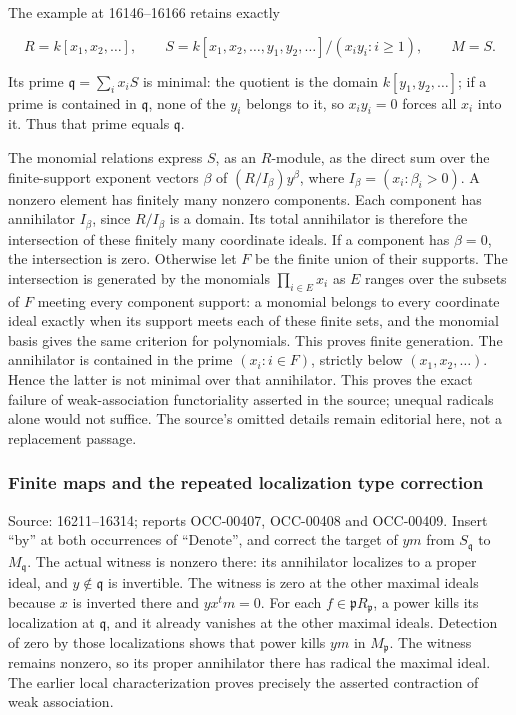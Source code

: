 The example at 16146--16166 retains exactly

\[
R=k[x_1,x_2,\ldots],\qquad
S=k[x_1,x_2,\ldots,y_1,y_2,\ldots]/(x_iy_i:i\geq1),\qquad M=S.
\]

Its prime \(\mathfrak q=\sum_i x_iS\) is minimal: the quotient is the domain \(k[y_1,y_2,\ldots]\); if a prime is contained in \(\mathfrak q\), none of the \(y_i\) belongs to it, so \(x_iy_i=0\) forces all \(x_i\) into it. Thus that prime equals \(\mathfrak q\).

The monomial relations express \(S\), as an \(R\)-module, as the direct sum over the finite-support exponent vectors \(\beta\) of \((R/I_\beta)y^\beta\), where \(I_\beta=(x_i:\beta_i>0)\). A nonzero element has finitely many nonzero components. Each component has annihilator \(I_\beta\), since \(R/I_\beta\) is a domain. Its total annihilator is therefore the intersection of these finitely many coordinate ideals. If a component has \(\beta=0\), the intersection is zero. Otherwise let \(F\) be the finite union of their supports. The intersection is generated by the monomials \(\prod_{i\in E}x_i\) as \(E\) ranges over the subsets of \(F\) meeting every component support: a monomial belongs to every coordinate ideal exactly when its support meets each of these finite sets, and the monomial basis gives the same criterion for polynomials. This proves finite generation. The annihilator is contained in the prime \((x_i:i\in F)\), strictly below \((x_1,x_2,\ldots)\). Hence the latter is not minimal over that annihilator. This proves the exact failure of weak-association functoriality asserted in the source; unequal radicals alone would not suffice. The source's omitted details remain editorial here, not a replacement passage.

\subsubsection{Finite maps and the repeated localization type correction}\label{finite-maps-and-the-repeated-localization-type-correction}

Source: 16211--16314; reports OCC-00407, OCC-00408 and OCC-00409. Insert ``by'' at both occurrences of ``Denote'', and correct the target of \(ym\) from \(S_{\mathfrak q}\) to \(M_{\mathfrak q}\). The actual witness is nonzero there: its annihilator localizes to a proper ideal, and \(y\notin\mathfrak q\) is invertible. The witness is zero at the other maximal ideals because \(x\) is inverted there and \(yx^tm=0\). For each \(f\in\mathfrak pR_{\mathfrak p}\), a power kills its localization at \(\mathfrak q\), and it already vanishes at the other maximal ideals. Detection of zero by those localizations shows that power kills \(ym\) in \(M_{\mathfrak p}\). The witness remains nonzero, so its proper annihilator there has radical the maximal ideal. The earlier local characterization proves precisely the asserted contraction of weak association.

